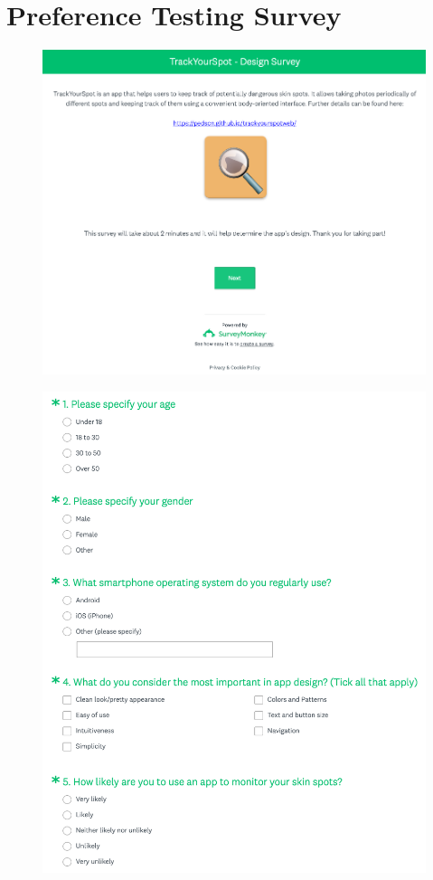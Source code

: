 \chapter{Preference Testing Survey}
\begin{figure}[H]
    \includegraphics[width=1.2\textwidth, center]{figures/surveyintro.png}
\end{figure}
\begin{figure}[H]
    \includegraphics[width=1.2\textwidth, center]{figures/survey1-5.png}
\end{figure}
